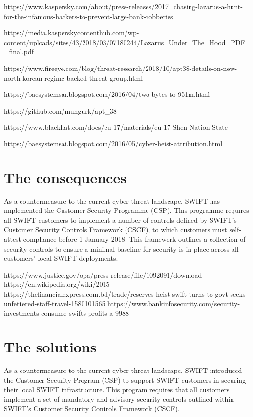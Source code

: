 \documentclass[12pt]{article}
\begin{document}
        https://www.kaspersky.com/about/press-releases/2017_chasing-lazarus-a-hunt-for-the-infamous-hackers-to-prevent-large-bank-robberies
        
        https://media.kasperskycontenthub.com/wp-content/uploads/sites/43/2018/03/07180244/Lazarus_Under_The_Hood_PDF_final.pdf
        
        https://www.fireeye.com/blog/threat-research/2018/10/apt38-details-on-new-north-korean-regime-backed-threat-group.html
        
        https://baesystemsai.blogspot.com/2016/04/two-bytes-to-951m.html
        
        https://github.com/mungurk/apt_38
        
        https://www.blackhat.com/docs/eu-17/materials/eu-17-Shen-Nation-State%
        
        https://baesystemsai.blogspot.com/2016/05/cyber-heist-attribution.html
        
\section{The consequences}
        
        As a countermeasure to the current cyber-threat landscape, SWIFT has implemented the Customer Security Programme (CSP). This programme requires all SWIFT customers to implement a number of controls defined by SWIFT’s Customer Security Controls Framework (CSCF), to which customers must self-attest compliance before 1 January 2018. This framework outlines a collection of security controls to ensure a minimal baseline for security is in place across all customers’ local SWIFT deployments.
        
        https://www.justice.gov/opa/press-release/file/1092091/download
        https://en.wikipedia.org/wiki/2015%
        https://thefinancialexpress.com.bd/trade/reserves-heist-swift-turns-to-govt-seeks-unfettered-staff-travel-1580101565
        https://www.bankinfosecurity.com/security-investments-consume-swifts-profits-a-9988
        
\section{The solutions}
        
        As a countermeasure to the current cyber-threat landscape, SWIFT introduced the Customer Security Program (CSP) to support SWIFT customers in securing their local SWIFT infrastructure. This program requires that all customers implement a set of mandatory and advisory security controls outlined within SWIFT’s Customer Security Controls Framework (CSCF).
        
\end{document}
